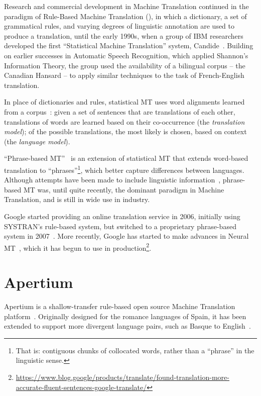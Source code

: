 Research and commercial development in Machine Translation continued in the paradigm of Rule-Based Machine 
Translation (), in which a dictionary, a set of grammatical rules, and varying degrees of 
linguistic annotation are used to produce a translation, until the early 1990s, when a group of IBM 
researchers developed the first ``Statistical Machine Translation'' system, 
Candide~\citep{berger1994candide}. Building on earlier successes in Automatic Speech Recognition, which 
applied Shannon's Information Theory, the group used the availability of a bilingual corpus -- the 
Canadian Hansard -- to apply similar techniques to the task of French-English translation. 

In place of dictionaries and rules, statistical MT uses word alignments learned from a 
corpus~\citep{brown1993}: given a set of sentences that are translations of each other, translations 
of words are learned based on their co-occurrence (the \textit{translation model}); of the possible 
translations, the most likely is chosen, based on context (the \textit{language model}).

``Phrase-based MT''~\citep{koehn2003} is an extension of statistical MT that extends word-based 
translation to ``phrases''\footnote{That is: contiguous chunks of collocated words, rather than a 
``phrase'' in the linguistic sense.}, which better capture differences between languages. Although 
attempts have been made to include linguistic information~\citep[e.g.][]{koehn2007}, phrase-based MT 
was, until quite recently, the dominant paradigm in Machine Translation, and is still in wide use in 
industry. 

Google started providing an online translation service in 2006, initially using SYSTRAN's rule-based 
system, but switched to a proprietary phrase-based system in 2007~\citep{tyson2012}. More recently,
Google has started to make advances in Neural MT~\citep{wu2016gnmt}, which it has begun to use in
production\footnote{\href{https://www.blog.google/products/translate/found-translation-more-accurate-fluent-sentences-google-translate/}{https://www.blog.google/products/translate/found-translation-more-accurate-fluent-sentences-google-translate/}}.

\section{Apertium}
\label{sect:bgapertium}

Apertium is a shallow-transfer rule-based open source Machine Translation platform~\citep{forcada11a}.
Originally designed for the romance languages of Spain, it has been extended to
support more divergent language pairs, such as Basque to English~\citep{oregan13peeking}.

